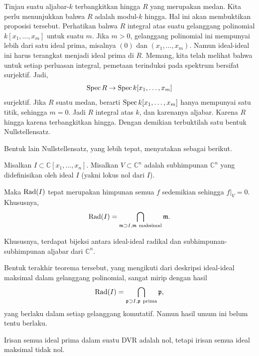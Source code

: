 Tinjau suatu aljabar-$k$ terbangkitkan hingga $R$ yang merupakan medan. Kita perlu
menunjukkan bahwa $R$ adalah modul-$k$
hingga. Hal ini akan membuktikan proposisi tersebut.
Perhatikan bahwa $R$ integral atas suatu gelanggang polinomial $k[x_1, \dots, x_m]$ untuk
suatu $m$.
Jika $m > 0$, gelanggang polinomial ini mempunyai lebih dari satu ideal prima,
misalnya $(0)$ dan $(x_1, \dots, x_m)$. Namun ideal-ideal ini harus terangkat menjadi ideal prima di
$R$. Memang, kita telah melihat bahwa untuk setiap perluasan integral, pemetaan
terinduksi pada spektrum bersifat surjektif. Jadi,
\[ \operatorname{Spec} R \to \operatorname{Spec} k[x_1, \dots, x_m]  \]
surjektif. Jika $R$ suatu medan, berarti $\operatorname{Spec} k[x_1, \dots, x_m]$ hanya mempunyai satu
titik, sehingga $m=0$. Jadi $R$ integral atas $k$, dan karenanya aljabar. Karena
$R$ hingga karena terbangkitkan hingga. Dengan demikian terbuktilah satu bentuk
Nullstellensatz.


 Bentuk lain Nullstellensatz, yang
lebih tepat, menyatakan sebagai berikut.

\begin{theorem} \label{gennullstellensatz}
Misalkan $I \subset \mathbb{C}[x_1, \dots, x_n]$. Misalkan $V \subset \mathbb{C}^n$ adalah
subhimpunan $\mathbb{C}^n$ yang didefinisikan oleh ideal $I$ (yakni lokus nol dari
$I$).

Maka $\operatorname{Rad}(I)$ tepat merupakan himpunan semua $f$ sedemikian sehingga $f|_V = 0$.
Khususnya,
\[ \operatorname{Rad}(I) = \bigcap_{\mathfrak{m} \supset I, \mathfrak{m} \
\mathrm{maksimal}} \mathfrak{m}.  \]
\end{theorem}

Khususnya, terdapat bijeksi antara ideal-ideal radikal dan subhimpunan-subhimpunan aljabar
dari $\mathbb{C}^n$.

Bentuk terakhir teorema tersebut, yang mengikuti dari deskripsi ideal-ideal maksimal
dalam gelanggang polinomial, sangat mirip dengan hasil
\[ \operatorname{Rad}(I) = \bigcap_{\mathfrak{p} \supset I, \mathfrak{p} \
\mathrm{prima}} \mathfrak{p},  \]
yang berlaku dalam setiap gelanggang komutatif. Namun hasil umum ini belum tentu
berlaku.

\begin{example}
Irisan semua ideal prima dalam suatu DVR adalah nol, tetapi irisan semua ideal
maksimal tidak nol.
\end{example}


